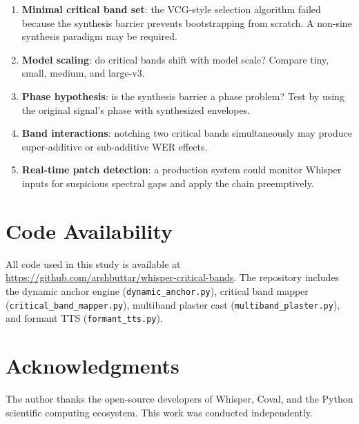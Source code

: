 \documentclass[11pt,a4paper]{article}
\begin{document}
\begin{enumerate}[leftmargin=*,itemsep=2pt]
    \item \textbf{Minimal critical band set}: the VCG-style selection algorithm
        failed because the synthesis barrier prevents bootstrapping from
        scratch. A non-sine synthesis paradigm may be required.
    \item \textbf{Model scaling}: do critical bands shift with model scale?
        Compare tiny, small, medium, and large-v3.
    \item \textbf{Phase hypothesis}: is the synthesis barrier a phase problem?
        Test by using the original signal's phase with synthesized envelopes.
    \item \textbf{Band interactions}: notching two critical bands simultaneously
        may produce super-additive or sub-additive WER effects.
    \item \textbf{Real-time patch detection}: a production system could monitor
        Whisper inputs for suspicious spectral gaps and apply the chain
        preemptively.
\end{enumerate}

\section*{Code Availability}
All code used in this study is available at
\url{https://github.com/arshbuttar/whisper-critical-bands}.
The repository includes the dynamic anchor engine
(\texttt{dynamic\_anchor.py}), critical band mapper
(\texttt{critical\_band\_mapper.py}), multiband plaster cast
(\texttt{multiband\_plaster.py}), and formant TTS (\texttt{formant\_tts.py}).

\section*{Acknowledgments}
The author thanks the open-source developers of Whisper, Coval, and the Python
scientific computing ecosystem. This work was conducted independently.
\end{document}
